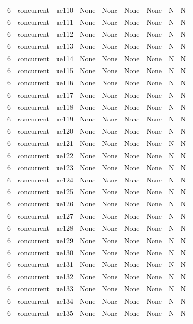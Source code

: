 \begin{table}[ht]
\begin{tabular}{|c|c|c|c|c|c|c|c|c|}
6 & concurrent & ue110 & None & None & None & None & N & N \\
6 & concurrent & ue111 & None & None & None & None & N & N \\
6 & concurrent & ue112 & None & None & None & None & N & N \\
6 & concurrent & ue113 & None & None & None & None & N & N \\
6 & concurrent & ue114 & None & None & None & None & N & N \\
6 & concurrent & ue115 & None & None & None & None & N & N \\
6 & concurrent & ue116 & None & None & None & None & N & N \\
6 & concurrent & ue117 & None & None & None & None & N & N \\
6 & concurrent & ue118 & None & None & None & None & N & N \\
6 & concurrent & ue119 & None & None & None & None & N & N \\
6 & concurrent & ue120 & None & None & None & None & N & N \\
6 & concurrent & ue121 & None & None & None & None & N & N \\
6 & concurrent & ue122 & None & None & None & None & N & N \\
6 & concurrent & ue123 & None & None & None & None & N & N \\
6 & concurrent & ue124 & None & None & None & None & N & N \\
6 & concurrent & ue125 & None & None & None & None & N & N \\
6 & concurrent & ue126 & None & None & None & None & N & N \\
6 & concurrent & ue127 & None & None & None & None & N & N \\
6 & concurrent & ue128 & None & None & None & None & N & N \\
6 & concurrent & ue129 & None & None & None & None & N & N \\
6 & concurrent & ue130 & None & None & None & None & N & N \\
6 & concurrent & ue131 & None & None & None & None & N & N \\
6 & concurrent & ue132 & None & None & None & None & N & N \\
6 & concurrent & ue133 & None & None & None & None & N & N \\
6 & concurrent & ue134 & None & None & None & None & N & N \\
6 & concurrent & ue135 & None & None & None & None & N & N \\

\end{tabular}
\end{table}
